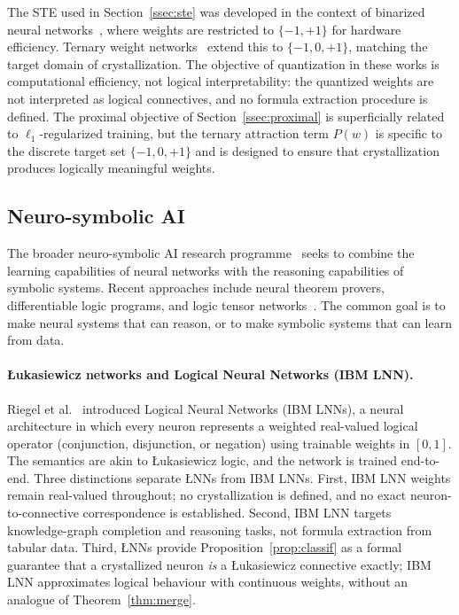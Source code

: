 \documentclass[10pt,a4paper,twoside]{article}
\newcommand{\LNN}{\L{}NN}
\begin{document}
The STE used in Section~\ref{ssec:ste} was developed in the context of
binarized neural networks~\cite{bengio2013,courbariaux2016}, where weights are
restricted to $\{-1, +1\}$ for hardware efficiency.
Ternary weight networks~\cite{li2016} extend this to $\{-1, 0, +1\}$,
matching the target domain of crystallization.
The objective of quantization in these works is computational efficiency,
not logical interpretability: the quantized weights are not interpreted as
logical connectives, and no formula extraction procedure is defined.
The proximal objective of Section~\ref{ssec:proximal} is superficially related
to $\ell_1$-regularized training, but the ternary attraction term $P(w)$
is specific to the discrete target set $\{-1, 0, +1\}$ and is designed to
ensure that crystallization produces logically meaningful weights.

\subsection{Neuro-symbolic AI}

The broader neuro-symbolic AI research programme~\cite{garcez2019,garcez2023}
seeks to combine the learning capabilities of neural networks with the
reasoning capabilities of symbolic systems.
Recent approaches include neural theorem provers, differentiable logic
programs, and logic tensor networks~\cite{hitzler2004}.
The common goal is to make neural systems that can reason, or to make symbolic
systems that can learn from data.

\paragraph{\L{}ukasiewicz networks and Logical Neural Networks (IBM LNN).}
Riegel et al.~\cite{riegel2020} introduced Logical Neural Networks (IBM LNNs),
a neural architecture in which every neuron represents a weighted real-valued
logical operator (conjunction, disjunction, or negation) using trainable
weights in $[0,1]$.
The semantics are akin to \L{}ukasiewicz logic, and the network is trained
end-to-end.
Three distinctions separate \LNN{}s from IBM LNNs.
First, IBM LNN weights remain real-valued throughout; no crystallization is
defined, and no exact neuron-to-connective correspondence is established.
Second, IBM LNN targets knowledge-graph completion and reasoning tasks, not
formula extraction from tabular data.
Third, \LNN{}s provide Proposition~\ref{prop:classif} as a formal guarantee
that a crystallized neuron \emph{is} a \L{}ukasiewicz connective exactly;
IBM LNN approximates logical behaviour with continuous weights, without an
analogue of Theorem~\ref{thm:merge}.
\end{document}
